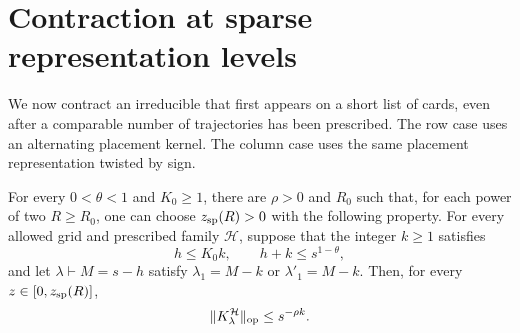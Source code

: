 \section{Contraction at sparse representation levels}\label{sec:sparse}
\label{ac:part:51}

We now contract an irreducible that first appears on a short list of cards,
even after a comparable number of trajectories has been prescribed. The row
case uses an alternating placement kernel. The column case uses the same
placement representation twisted by sign.

\begin{lemma}\label{lem:sparse}
For every \(0<\theta<1\) and \(K_0\ge1\), there are \(\rho>0\) and \(R_0\)
such that, for each power of two \(R\ge R_0\), one can choose
\(z_{\rm sp}(R)>0\) with the following property. For every allowed grid and
prescribed family \(\mathcal H\), suppose that the integer \(k\ge1\) satisfies
\begin{equation}
 h\le K_0 k,\qquad h+k\le s^{1-\theta},
 \label{ac:eq:5}
\end{equation}
and let \(\lambda\vdash M=s-h\) satisfy
\(\lambda_1=M-k\) or \(\lambda'_1=M-k\). Then, for every
\(z\in[0,z_{\rm sp}(R)]\),
\begin{equation}
 \|K_\lambda^{\mathcal H}\|_{\rm op}\le s^{-\rho k}.
 \label{ac:eq:6}
\end{equation}
\end{lemma}
